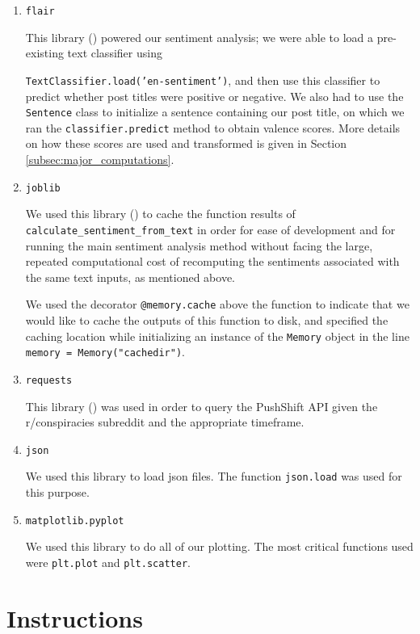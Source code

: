 \documentclass[fontsize=11pt]{article}
\begin{document}
\begin{enumerate}
    \item \texttt{flair}
    
    This library (\cite{akbik2019flair}) powered our sentiment analysis; we were able to load a pre-existing text classifier using 
    
    \texttt{TextClassifier.load('en-sentiment')}, and then use this classifier to predict whether post titles were positive or negative. We also had to use the \texttt{Sentence} class to initialize a sentence containing our post title, on which we ran the \texttt{classifier.predict} method to obtain valence scores. More details on how these scores are used and transformed is given in Section \ref{subsec:major_computations}.
    
    \item \texttt{joblib}
    
    We used this library (\cite{joblib}) to cache the function results of \texttt{calculate\_sentiment\_from\_text} in order for ease of development and for running the main sentiment analysis method without facing the large, repeated computational cost of recomputing the sentiments associated with the same text inputs, as mentioned above. 
    
    We used the decorator \texttt{@memory.cache} above the function to indicate that we would like to cache the outputs of this function to disk, and specified the caching location while initializing an instance of the \texttt{Memory} object in the line \texttt{memory = Memory("cachedir")}.
    
    \item \texttt{requests}
    
    This library (\cite{noauthor_requests:_nodate}) was used in order to query the PushShift API given the r/conspiracies subreddit and the appropriate timeframe.
    \item \texttt{json}
    
    We used this library to load json files. The function \texttt{json.load} was used for this purpose.
    \item \texttt{matplotlib.pyplot}
    
    We used this library to do all of our plotting. The most critical functions used were \texttt{plt.plot} and \texttt{plt.scatter}.
\end{enumerate}

\section{Instructions}
\end{document}
